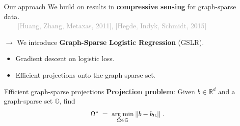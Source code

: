 \documentclass[svgnames,final]{beamer}
\newcommand{\thetatilde}{\ensuremath{\tilde{\theta}}}
\newcommand{\R}{\ensuremath{\mathbb{R}}}
\newcommand{\thetahat}{\ensuremath{\hat{\theta}}}
\DeclareMathOperator*{\argmin}{arg\,min}
\DeclarePairedDelimiter{\norm}{\lVert}{\rVert}
\begin{document}
\begin{frame}
\begin{columns}[T]
\begin{column}{.3\linewidth}

	\begin{block}{Our approach}
    We build on results in \textbf{compressive sensing} for graph-sparse data.\\[.3cm]
		$\qquad$\textcolor{darkgray}{[Huang, Zhang, Metaxas, 2011], [Hegde, Indyk, Schmidt, 2015]}
		\vspace{1.2cm}

		$\rightarrow$ We introduce \textbf{Graph-Sparse Logistic Regression} (GSLR).\\[.2cm]
		\begin{itemize}
			\item Gradient descent on logistic loss.\\[.2cm]
			\item Efficient projections onto the graph sparse set.
		\end{itemize}

		\vspace{1cm}
    
	\end{block}

	\vspace{1.0cm}

	\begin{block}{Efficient graph-sparse projections}
	\vspace{-.5cm}
	\textbf{Projection problem}: Given $b \in \R^d$ and a graph-sparse set $\mathbb{G}$, find
	{\Large
	\[
		\Omega^* \; = \; \argmin_{\Omega \in \mathbb{G}} \, \norm{b  - b_{\Omega}} \; .
	\]
	}
	
	\end{block}
\end{column}


\end{columns}
\end{frame}
\end{document}
